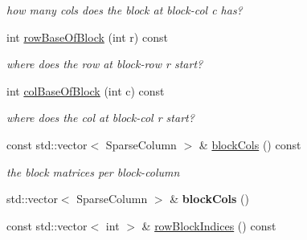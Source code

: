 \begin{DoxyCompactItemize}
\begin{DoxyCompactList}\small\item\em how many cols does the block at block-\/col c has? \end{DoxyCompactList}\item 
\hypertarget{classg2o_1_1SparseBlockMatrixCCS_a8b35a98d3343554699811f682042a647}{int \hyperlink{classg2o_1_1SparseBlockMatrixCCS_a8b35a98d3343554699811f682042a647}{row\-Base\-Of\-Block} (int r) const }\label{classg2o_1_1SparseBlockMatrixCCS_a8b35a98d3343554699811f682042a647}

\begin{DoxyCompactList}\small\item\em where does the row at block-\/row r start? \end{DoxyCompactList}\item 
\hypertarget{classg2o_1_1SparseBlockMatrixCCS_a3a2820367f643881ebd0a45f2cd0c9be}{int \hyperlink{classg2o_1_1SparseBlockMatrixCCS_a3a2820367f643881ebd0a45f2cd0c9be}{col\-Base\-Of\-Block} (int c) const }\label{classg2o_1_1SparseBlockMatrixCCS_a3a2820367f643881ebd0a45f2cd0c9be}

\begin{DoxyCompactList}\small\item\em where does the col at block-\/col r start? \end{DoxyCompactList}\item 
\hypertarget{classg2o_1_1SparseBlockMatrixCCS_ae43c6599984015bdc3d481266e1555ea}{const std\-::vector$<$ Sparse\-Column $>$ \& \hyperlink{classg2o_1_1SparseBlockMatrixCCS_ae43c6599984015bdc3d481266e1555ea}{block\-Cols} () const }\label{classg2o_1_1SparseBlockMatrixCCS_ae43c6599984015bdc3d481266e1555ea}

\begin{DoxyCompactList}\small\item\em the block matrices per block-\/column \end{DoxyCompactList}\item 
\hypertarget{classg2o_1_1SparseBlockMatrixCCS_a5a9ef3cd8399a335edec8b7e934192b8}{std\-::vector$<$ Sparse\-Column $>$ \& {\bfseries block\-Cols} ()}\label{classg2o_1_1SparseBlockMatrixCCS_a5a9ef3cd8399a335edec8b7e934192b8}

\item 
\hypertarget{classg2o_1_1SparseBlockMatrixCCS_ad64c68168586e5088e767ca74ca8ba46}{const std\-::vector$<$ int $>$ \& \hyperlink{classg2o_1_1SparseBlockMatrixCCS_ad64c68168586e5088e767ca74ca8ba46}{row\-Block\-Indices} () const }\label{classg2o_1_1SparseBlockMatrixCCS_ad64c68168586e5088e767ca74ca8ba46}


\end{DoxyCompactItemize}
